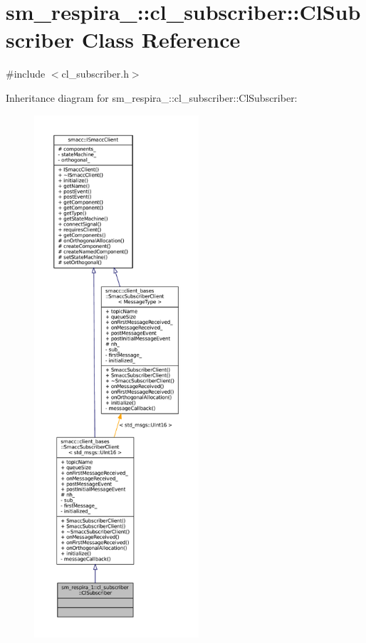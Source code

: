 \hypertarget{classsm__respira__1_1_1cl__subscriber_1_1ClSubscriber}{}\section{sm\+\_\+respira\+\_\+:\+:cl\+\_\+subscriber\+:\+:Cl\+Subscriber Class Reference}
\label{classsm__respira__1_1_1cl__subscriber_1_1ClSubscriber}


{\ttfamily \#include $<$cl\+\_\+subscriber.\+h$>$}



Inheritance diagram for sm\+\_\+respira\+\_\+:\+:cl\+\_\+subscriber\+:\+:Cl\+Subscriber\+:
\nopagebreak
\begin{figure}[H]
\begin{center}
\leavevmode
\includegraphics[height=550pt]{classsm__respira__1_1_1cl__subscriber_1_1ClSubscriber__inherit__graph}
\end{center}
\end{figure}


